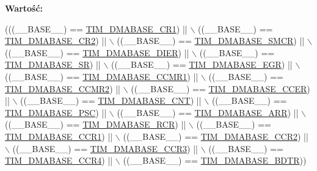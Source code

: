 {\bfseries Wartość\+:}
\begin{DoxyCode}
(((\_\_BASE\_\_) == \hyperlink{group___t_i_m___d_m_a___base__address_ga97bbe74e5ae8680c020a6b0f760d8909}{TIM\_DMABASE\_CR1})   || \(\backslash\)
                                   ((\_\_BASE\_\_) == \hyperlink{group___t_i_m___d_m_a___base__address_ga53d60ce92015bb60d608e60c45b1fdda}{TIM\_DMABASE\_CR2})   || \(\backslash\)
                                   ((\_\_BASE\_\_) == \hyperlink{group___t_i_m___d_m_a___base__address_ga184ad86a4c6d48263f57d3e7106675c4}{TIM\_DMABASE\_SMCR})  || \(\backslash\)
                                   ((\_\_BASE\_\_) == \hyperlink{group___t_i_m___d_m_a___base__address_ga137d2e3858ae68333646fea6e04503da}{TIM\_DMABASE\_DIER})  || \(\backslash\)
                                   ((\_\_BASE\_\_) == \hyperlink{group___t_i_m___d_m_a___base__address_gaf0da2213e3e7b6aaaa9b738ec85abc02}{TIM\_DMABASE\_SR})    || \(\backslash\)
                                   ((\_\_BASE\_\_) == \hyperlink{group___t_i_m___d_m_a___base__address_gaff6d230aafb918047d62e877d21b3bdc}{TIM\_DMABASE\_EGR})   || \(\backslash\)
                                   ((\_\_BASE\_\_) == \hyperlink{group___t_i_m___d_m_a___base__address_gac94d74bf77d5ce139c7fa6e0b8c2da44}{TIM\_DMABASE\_CCMR1}) || \(\backslash\)
                                   ((\_\_BASE\_\_) == \hyperlink{group___t_i_m___d_m_a___base__address_ga94f3dcf13674f397fee0ef816ad973cf}{TIM\_DMABASE\_CCMR2}) || \(\backslash\)
                                   ((\_\_BASE\_\_) == \hyperlink{group___t_i_m___d_m_a___base__address_ga64cb24a6d9d96d950be64586923c7447}{TIM\_DMABASE\_CCER})  || \(\backslash\)
                                   ((\_\_BASE\_\_) == \hyperlink{group___t_i_m___d_m_a___base__address_gae711483dbf4f0eafb2505b8f823c4724}{TIM\_DMABASE\_CNT})   || \(\backslash\)
                                   ((\_\_BASE\_\_) == \hyperlink{group___t_i_m___d_m_a___base__address_gae23315a3ef1af7dccfbbfada90355bd8}{TIM\_DMABASE\_PSC})   || \(\backslash\)
                                   ((\_\_BASE\_\_) == \hyperlink{group___t_i_m___d_m_a___base__address_ga3e08cd689d59f76dd5ca958a0ffdfb3d}{TIM\_DMABASE\_ARR})   || \(\backslash\)
                                   ((\_\_BASE\_\_) == \hyperlink{group___t_i_m___d_m_a___base__address_gac26cff34f1d207798b946c01a40f5d89}{TIM\_DMABASE\_RCR})   || \(\backslash\)
                                   ((\_\_BASE\_\_) == \hyperlink{group___t_i_m___d_m_a___base__address_ga2d1bc7e5ae83b91caa352276d15142dc}{TIM\_DMABASE\_CCR1})  || \(\backslash\)
                                   ((\_\_BASE\_\_) == \hyperlink{group___t_i_m___d_m_a___base__address_ga0c73e7e1fa212ab14a43ca49e9d8850e}{TIM\_DMABASE\_CCR2})  || \(\backslash\)
                                   ((\_\_BASE\_\_) == \hyperlink{group___t_i_m___d_m_a___base__address_gae3c259f405c78e31411c19195eac48bc}{TIM\_DMABASE\_CCR3})  || \(\backslash\)
                                   ((\_\_BASE\_\_) == \hyperlink{group___t_i_m___d_m_a___base__address_gaea24fd3f528163da065cbdce3c68ef23}{TIM\_DMABASE\_CCR4})  || \(\backslash\)
                                   ((\_\_BASE\_\_) == \hyperlink{group___t_i_m___d_m_a___base__address_ga767eab033d485d32de80b46f70be3341}{TIM\_DMABASE\_BDTR}))
\end{DoxyCode}


